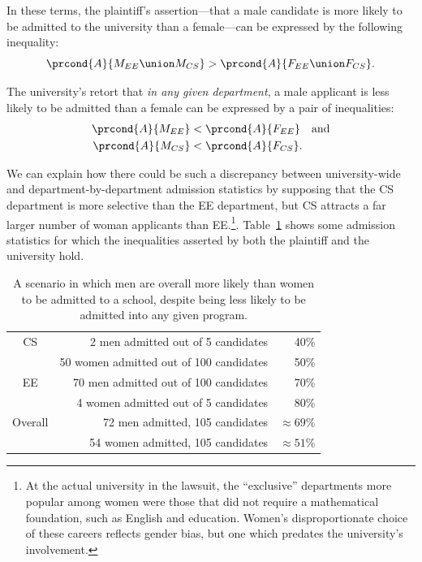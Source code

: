 In these terms, the plaintiff's assertion---that a male candidate is
more likely to be admitted to the university than a female---can be
expressed by the following inequality:
\[
    \prcond{A}{M_{EE} \union M_{CS}} > \prcond{A}{F_{EE} \union F_{CS}}.
\]

The university's retort that \emph{in any given department}, a male
applicant is less likely to be admitted than a female can be expressed
by a pair of inequalities:
\begin{align*}
\prcond{A}{M_{EE}} & < \prcond{A}{F_{EE}} \quad\text{and}\\
\prcond{A}{M_{CS}} & < \prcond{A}{F_{CS}}.
\end{align*}

We can explain how there could be such a discrepancy between
university-wide and department-by-department admission statistics by
supposing that the CS department is more selective than the EE
department, but CS attracts a far larger number of woman applicants
than EE.\footnote{At the actual university in the lawsuit, the
  ``exclusive'' departments more popular among women were those that
  did not require a mathematical foundation, such as English and
  education.  Women's disproportionate choice of these careers
  reflects gender bias, but one which predates the university's
  involvement.}.  Table~\ref{fig:15D3} shows some admission statistics
for which the inequalities asserted by both the plaintiff and the
university hold.

\begin{table}

\begin{tabular}{crr}
CS & 2 men admitted out of 5 candidates      &   40\% \\
   & 50 women admitted out of 100 candidates     &  50\% \\
EE & 70 men admitted out of 100 candidates   &  70\% \\
   & 4 women admitted out of 5 candidates         & 80\% \\
\hline
Overall & 72 men admitted, 105 candidates & $\approx 69\%$ \\
        & 54 women admitted, 105 candidates   & $\approx 51\%$
\end{tabular}

\caption{A scenario in which men are overall more likely than women to
  be admitted to a school, despite being less likely to be admitted
  into any given program.}

\label{fig:15D3}

\end{table}


